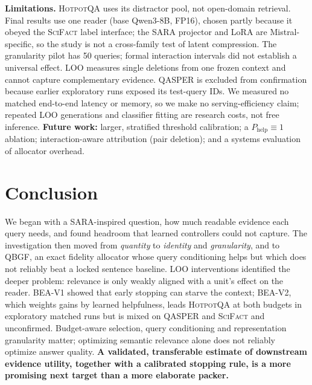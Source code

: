 \documentclass[10pt,twocolumn,letterpaper]{article}
\newcommand{\hotpot}{\textsc{HotpotQA}\xspace}
\newcommand{\qasper}{\textsc{QASPER}\xspace}
\newcommand{\scifact}{\textsc{SciFact}\xspace}
\newcommand{\Phelp}{P_{\mathrm{help}}}
\begin{document}
\textbf{Limitations.} \hotpot uses its distractor pool, not open-domain retrieval. Final results use one reader (base Qwen3-8B, FP16), chosen partly because it obeyed the \scifact label interface; the SARA projector and LoRA are Mistral-specific, so the study is not a cross-family test of latent compression. The granularity pilot has 50 queries; formal interaction intervals did not establish a universal effect. LOO measures single deletions from one frozen context and cannot capture complementary evidence. \qasper is excluded from confirmation because earlier exploratory runs exposed its test-query IDs. We measured no matched end-to-end latency or memory, so we make no serving-efficiency claim; repeated LOO generations and classifier fitting are research costs, not free inference. \textbf{Future work:} larger, stratified threshold calibration; a $\Phelp\equiv1$ ablation; interaction-aware attribution (pair deletion); and a systems evaluation of allocator overhead.

\section{Conclusion}\label{sec:concl}
We began with a SARA-inspired question, how much readable evidence each query needs, and found headroom that learned controllers could not capture. The investigation then moved from \emph{quantity} to \emph{identity} and \emph{granularity}, and to QBGF, an exact fidelity allocator whose query conditioning helps but which does not reliably beat a locked sentence baseline. LOO interventions identified the deeper problem: relevance is only weakly aligned with a unit's effect on the reader. BEA-V1 showed that early stopping can starve the context; BEA-V2, which weights gains by learned helpfulness, leads \hotpot at both budgets in exploratory matched runs but is mixed on \qasper and \scifact and unconfirmed. Budget-aware selection, query conditioning and representation granularity matter; optimizing semantic relevance alone does not reliably optimize answer quality. \textbf{A validated, transferable estimate of downstream evidence utility, together with a calibrated stopping rule, is a more promising next target than a more elaborate packer.}
\end{document}
